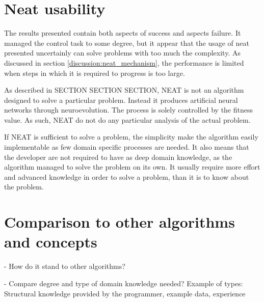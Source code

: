 \section{Neat usability}

The results presented contain both aspects of success and aspects failure. It managed the control task to some degree, but it appear that the usage of neat presented uncertainly can solve problems with too much the complexity. As discussed in section \ref{discussion:neat_mechanism}, the performance is limited when steps in which it is required to progress is too large.

As described in SECTION SECTION SECTION, NEAT is not an algorithm designed to solve a particular problem. Instead it produces artificial neural networks through neuroevolution. The process is solely controlled by the fitness value. As such, NEAT do not do any particular analysis of the actual problem. 

If NEAT is sufficient to solve a problem, the simplicity make the algorithm easily implementable as few domain specific processes are needed. It also means that the developer are not required to have as deep domain knowledge, as the algorithm managed to solve the problem on its own. It usually require more effort and advanced knowledge in order to solve a problem, than it is to know about the problem.



\section{Comparison to other algorithms and concepts}
- How do it stand to other algorithms?

- Compare degree and type of domain knowledge needed? Example of types: Structural knowledge provided by the programmer, example data, experience



